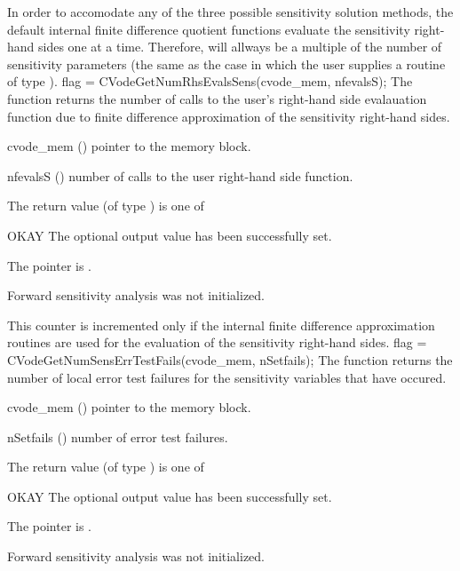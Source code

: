 {
  In order to accomodate any of the three possible sensitivity solution methods,
  the default internal 
  finite difference quotient functions evaluate the sensitivity right-hand sides 
  one at a time. Therefore,  will allways be a multiple of the
  number of sensitivity parameters (the same as the case in which the user supplies
  a routine of type ).
}
{
  flag = CVodeGetNumRhsEvalsSens(cvode\_mem, nfevalsS);
}
{
  The function  returns the number of calls to the
  user's right-hand side evalauation function due to finite difference approximation
  of the sensitivity right-hand sides.
}
{
  \begin{args}
  \item[cvode\_mem] ()
    pointer to the {\cvodes} memory block.
  \item[nfevalsS] ()
    number of calls to the user right-hand side function.
  \end{args}
}
{
  The return value  (of type ) is one of
  \begin{args}
  \item[OKAY] 
    The optional output value has been successfully set.
  \item[\Id{CVG\_NO\_MEM}]
    The  pointer is .
  \item[\Id{CVG\_NO\_SENS}]
    Forward sensitivity analysis was not initialized.
  \end{args}
}
{
  This counter is incremented only if the internal finite difference approximation
  routines are used for the evaluation of the sensitivity right-hand sides.
}
{
  flag = CVodeGetNumSensErrTestFails(cvode\_mem, nSetfails);
}
{
  The function  returns the number of local
  error test failures for the sensitivity variables that have occured.
}
{
  \begin{args}
  \item[cvode\_mem] ()
    pointer to the {\cvodes} memory block.
  \item[nSetfails] ()
    number of error test failures.
  \end{args}
}
{
  The return value  (of type ) is one of
  \begin{args}
  \item[OKAY] 
    The optional output value has been successfully set.
  \item[\Id{CVG\_NO\_MEM}]
    The  pointer is .
  \item[\Id{CVG\_NO\_SENS}]
    Forward sensitivity analysis was not initialized.
  \end{args}
}
